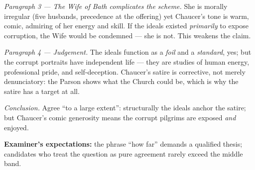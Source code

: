 \documentclass[11pt]{article}
\begin{document}
\begin{corrige}
\emph{Paragraph 3 --- The Wife of Bath complicates the scheme.} She is morally irregular (five husbands, precedence at the offering) yet Chaucer's tone is warm, comic, admiring of her energy and skill. If the ideals existed \emph{primarily} to expose corruption, the Wife would be condemned --- she is not. This weakens the claim.

\emph{Paragraph 4 --- Judgement.} The ideals function as a \emph{foil} and a \emph{standard}, yes; but the corrupt portraits have independent life --- they are studies of human energy, professional pride, and self-deception. Chaucer's satire is corrective, not merely denunciatory: the Parson shows what the Church could be, which is why the satire has a target at all.

\emph{Conclusion.} Agree ``to a large extent'': structurally the ideals anchor the satire; but Chaucer's comic generosity means the corrupt pilgrims are exposed \emph{and} enjoyed.

\textbf{Examiner's expectations:} the phrase ``how far'' demands a qualified thesis; candidates who treat the question as pure agreement rarely exceed the middle band.
\end{corrige}
\end{document}
